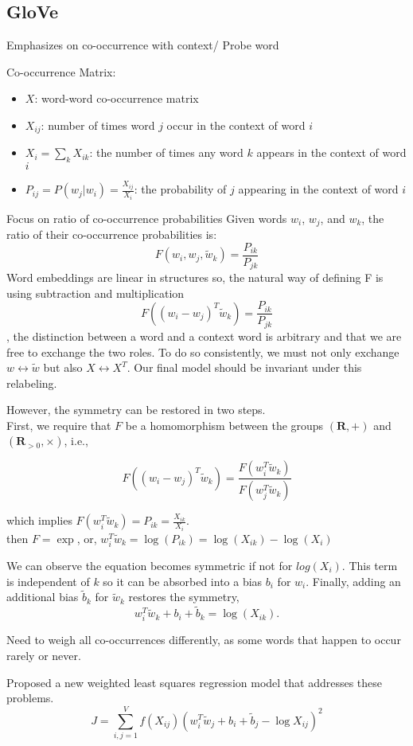 \documentclass[12pt]{article}
\newcommand{\bold}[1]{\textbf{#1}}
\begin{document}
    \subsection{GloVe}
        Emphasizes on co-occurrence with context/ Probe word 
        \begin{mdframed}
            Co-occurrence Matrix:
            \begin{itemize}
                \item $X$: word-word co-occurrence matrix
                \item $X_{ij}$: number of times word $j$ occur in the context of word $i$
                \item $X_i = \sum_k X_{ik}$: the number of times any word $k$ appears in the context of word $i$
                \item $P_{ij} = P(w_j | w_i) = \frac{X_{ij}}{X_i}$: the probability of $j$ appearing in the context of word $i$
            \end{itemize}
        \end{mdframed}

        Focus on ratio of co-occurrence probabilities
        Given words $w_i$, $w_j$, and $w_k$, the ratio of their co-occurrence probabilities is:
        \[
            F(w_i, w_j, \tilde{w}_k) = \frac{P_{ik}}{P_{jk}}
        \]
        Word embeddings are linear in structures
        so, the natural way of defining F is using subtraction and multiplication
        \[
            F((w_i-w_j)^T\tilde{w}_k) = \frac{P_{ik}}{P_{jk}}
        \]
        , the distinction between a word and a context word is arbitrary and that we are free to 
        exchange the two roles. To do so consistently, we must not only exchange $w \leftrightarrow 
        \tilde{w}$ but also $X \leftrightarrow X^T$. Our final model should be invariant under this relabeling.
        
        However, the symmetry can be restored in two steps. \\
        First, we require that $F$ be a 
        homomorphism between the groups $(\bold{R},+)$ and $(\bold{R}_{>0}, \times)$, i.e.,
        
        \[
            F((w_i - w_j)^T \tilde{w}_k) = \frac{F(w_i^T \tilde{w}_k)}{ F(w_j^T \tilde{w}_k)}
        \]

        which implies $F(w_i^T \tilde{w}_k) = P_{ik} = \frac{X_{ik}}{X_i}$. \\
        then $F = \exp$, or, $w_i^T \tilde{w}_k = \log(P_{ik}) = \log(X_{ik}) - \log(X_i)$

        We can observe the equation becomes symmetric if not for $log(X_i)$.
        This term is independent of $k$ so it can be absorbed into a bias $b_i$ for $w_i$. Finally, adding an additional bias $\tilde{b}_k$ for $\tilde{w}_k$ restores the symmetry,
        \[w_i^T \tilde{w}_k + b_i + \tilde{b}_k = \log(X_{ik}).\]

        Need to weigh all co-occurrences differently, as some words
        that happen to occur rarely or never. 

        Proposed a new weighted least squares regression model that addresses these problems.
        \[
            J = \sum_{i,j=1}^{V} f(X_{ij}) (w_i^T \tilde{w}_j + b_i + \tilde{b}_j - \log X_{ij})^2
        \]
\end{document}
